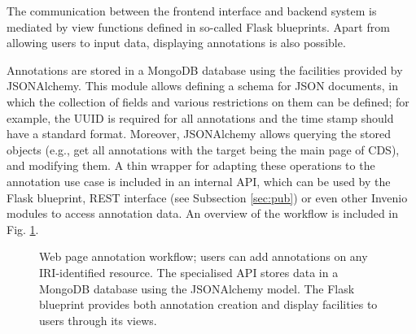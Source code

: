 The communication between the frontend interface and backend system is mediated
by view functions defined in so-called Flask blueprints. Apart from allowing
users to input data, displaying annotations is also possible.

Annotations are stored in a MongoDB database \cite{ref:mongo} using the
facilities provided by JSONAlchemy. This module allows defining a schema for
JSON documents, in which the collection of fields and various restrictions on
them can be defined; for example, the UUID is required for all annotations and
the time stamp should have a standard format. Moreover, JSONAlchemy allows
querying the stored objects (e.g., get all annotations with the target being
the main page of CDS), and modifying them. A thin wrapper for adapting these
operations to the annotation use case is included in an internal API, which can
be used by the Flask blueprint, REST interface (see Subsection \ref{sec:pub})
or even other Invenio modules to access annotation data. An overview of the
workflow is included in Fig. \ref{fig:baseanno}.

\begin{figure}[!ht]
  \centering
  \caption[Web page annotation workflow]
          {Web page annotation workflow; users can add annotations on any
           IRI-identified resource. The specialised API stores data in a
           MongoDB database using the JSONAlchemy model. The Flask blueprint
           provides both annotation creation and display facilities to users
           through its views.}
  \label{fig:baseanno}
\end{figure}
